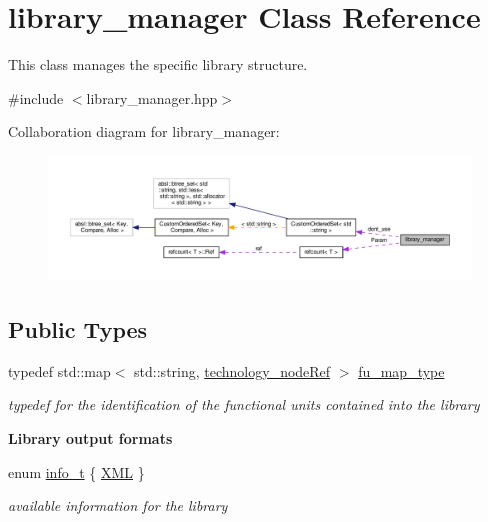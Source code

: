 \hypertarget{classlibrary__manager}{}\section{library\+\_\+manager Class Reference}
\label{classlibrary__manager}


This class manages the specific library structure.  




{\ttfamily \#include $<$library\+\_\+manager.\+hpp$>$}



Collaboration diagram for library\+\_\+manager\+:
\nopagebreak
\begin{figure}[H]
\begin{center}
\leavevmode
\includegraphics[width=350pt]{d6/dfe/classlibrary__manager__coll__graph}
\end{center}
\end{figure}
\subsection*{Public Types}
\begin{DoxyCompactItemize}
\item 
typedef std\+::map$<$ std\+::string, \hyperlink{technology__node_8hpp_a33dd193b7bd6b987bf0d8a770a819fa7}{technology\+\_\+node\+Ref} $>$ \hyperlink{classlibrary__manager_a17941addb97906d7b41c5b0b0317fde2}{fu\+\_\+map\+\_\+type}
\begin{DoxyCompactList}\small\item\em typedef for the identification of the functional units contained into the library \end{DoxyCompactList}\end{DoxyCompactItemize}
\begin{Indent}\textbf{ Library output formats}\par
\begin{DoxyCompactItemize}
\item 
enum \hyperlink{classlibrary__manager_a5914a62c60d05c22f2547de9d8ef20de}{info\+\_\+t} \{ \hyperlink{classlibrary__manager_a5914a62c60d05c22f2547de9d8ef20dea6a31f2ebb20dd6acab09c1d34dc2e6c4}{X\+ML}
 \}\begin{DoxyCompactList}\small\item\em available information for the library \end{DoxyCompactList}
\end{DoxyCompactItemize}
\end{Indent}

